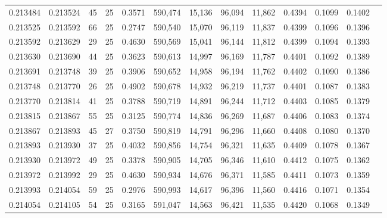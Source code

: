 \begin{tabular}{rrrrrrrrrrrrr}
0.213484 & 0.213524 &  45 &  25 &                                     0.3571 & 590,474 &  15,136 &  96,094 &  11,862 & 0.4394 & 0.1099 & 0.1402 \\
0.213525 & 0.213592 &  66 &  25 &                                     0.2747 & 590,540 &  15,070 &  96,119 &  11,837 & 0.4399 & 0.1096 & 0.1396 \\
0.213592 & 0.213629 &  29 &  25 &                                     0.4630 & 590,569 &  15,041 &  96,144 &  11,812 & 0.4399 & 0.1094 & 0.1393 \\
0.213630 & 0.213690 &  44 &  25 &                                     0.3623 & 590,613 &  14,997 &  96,169 &  11,787 & 0.4401 & 0.1092 & 0.1389 \\
0.213691 & 0.213748 &  39 &  25 &                                     0.3906 & 590,652 &  14,958 &  96,194 &  11,762 & 0.4402 & 0.1090 & 0.1386 \\
0.213748 & 0.213770 &  26 &  25 &                                     0.4902 & 590,678 &  14,932 &  96,219 &  11,737 & 0.4401 & 0.1087 & 0.1383 \\
0.213770 & 0.213814 &  41 &  25 &                                     0.3788 & 590,719 &  14,891 &  96,244 &  11,712 & 0.4403 & 0.1085 & 0.1379 \\
0.213815 & 0.213867 &  55 &  25 &                                     0.3125 & 590,774 &  14,836 &  96,269 &  11,687 & 0.4406 & 0.1083 & 0.1374 \\
0.213867 & 0.213893 &  45 &  27 &                                     0.3750 & 590,819 &  14,791 &  96,296 &  11,660 & 0.4408 & 0.1080 & 0.1370 \\
0.213893 & 0.213930 &  37 &  25 &                                     0.4032 & 590,856 &  14,754 &  96,321 &  11,635 & 0.4409 & 0.1078 & 0.1367 \\
0.213930 & 0.213972 &  49 &  25 &                                     0.3378 & 590,905 &  14,705 &  96,346 &  11,610 & 0.4412 & 0.1075 & 0.1362 \\
0.213972 & 0.213992 &  29 &  25 &                                     0.4630 & 590,934 &  14,676 &  96,371 &  11,585 & 0.4411 & 0.1073 & 0.1359 \\
0.213993 & 0.214054 &  59 &  25 &                                     0.2976 & 590,993 &  14,617 &  96,396 &  11,560 & 0.4416 & 0.1071 & 0.1354 \\
0.214054 & 0.214105 &  54 &  25 &                                     0.3165 & 591,047 &  14,563 &  96,421 &  11,535 & 0.4420 & 0.1068 & 0.1349 \\

\end{tabular}

